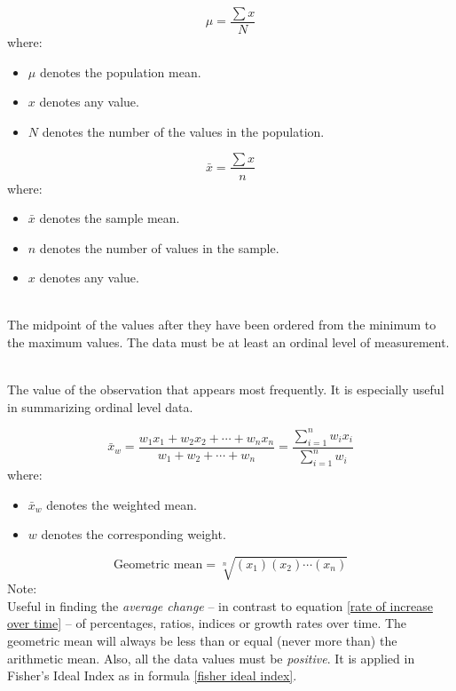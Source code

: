 \hformbar

\begin{equation}
\label{population mean raw data}
\mu =\frac{\sum x}{N}
\end{equation}
where:
\begin{itemize}
 \item $\mu$ denotes the population mean.
 \item $x$ denotes any value.
 \item $N$ denotes the number of the values in the population.
\end{itemize}
\hformbar


\begin{equation}
\label{sample mean}
\bar{x}=\frac{\sum x}{n}
\end{equation}
where:
\begin{itemize}
\item $\bar{x}$ denotes the sample mean.
\item $n$ denotes the number of values in the sample.
\item $x$ denotes any value.
\end{itemize}
\hformbar


\\
The midpoint of the values after they have been ordered from the minimum to the maximum values. The data must be at least an ordinal level of measurement.
\hformbar


\\
The value of the observation that appears most frequently. It is especially useful in summarizing ordinal level data.
\hformbar


\begin{equation}
\label{weighted mean}
\bar{x}_{w} = \frac{w_1 x_1 + w_2 x_2 + \cdots + w_n x_n}{w_1 + w_2 + \cdots + w_n} =  \frac{ \sum\limits_{i=1}^n w_i x_i}{\sum\limits_{i=1}^n w_i}	
\end{equation}
where:
\begin{itemize}
 \item $\bar{x}_{w}$ denotes the weighted mean.
 \item $w$ denotes the corresponding weight.
\end{itemize}
\hformbar

\begin{equation}
\label{geometric mean}
\text{Geometric mean} = \sqrt[n]{(x_{1})(x_{2}) \cdots (x_{n})}
\end{equation}
Note:\\ 
Useful in finding the \emph{average change} -- in contrast to equation \eqref{rate of increase over time} -- of percentages, ratios, indices or growth rates over time. The geometric mean will always be less than or equal (never more than) the arithmetic mean. Also, all the data values must be \emph{positive}. It is applied in Fisher's Ideal Index as in formula \eqref{fisher ideal index}.
\hformbar



